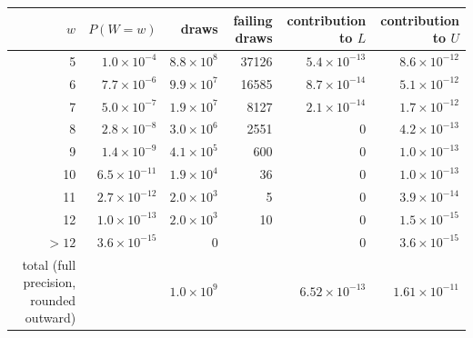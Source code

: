 \begin{tabular}{rrrrrr}\hline\hline
$w$ & $P(W=w)$ & draws & failing draws & contribution to $L$ & contribution to $U$\\\hline
5 & $1.0\times10^{-4}$ & $8.8\times10^{8}$ & 37126 & $5.4\times10^{-13}$ & $8.6\times10^{-12}$\\
6 & $7.7\times10^{-6}$ & $9.9\times10^{7}$ & 16585 & $8.7\times10^{-14}$ & $5.1\times10^{-12}$\\
7 & $5.0\times10^{-7}$ & $1.9\times10^{7}$ & 8127 & $2.1\times10^{-14}$ & $1.7\times10^{-12}$\\
8 & $2.8\times10^{-8}$ & $3.0\times10^{6}$ & 2551 & 0 & $4.2\times10^{-13}$\\
9 & $1.4\times10^{-9}$ & $4.1\times10^{5}$ & 600 & 0 & $1.0\times10^{-13}$\\
10 & $6.5\times10^{-11}$ & $1.9\times10^{4}$ & 36 & 0 & $1.0\times10^{-13}$\\
11 & $2.7\times10^{-12}$ & $2.0\times10^{3}$ & 5 & 0 & $3.9\times10^{-14}$\\
12 & $1.0\times10^{-13}$ & $2.0\times10^{3}$ & 10 & 0 & $1.5\times10^{-15}$\\
$>12$ & $3.6\times10^{-15}$ & 0 & & 0 & $3.6\times10^{-15}$\\\hline
total (full precision, rounded outward) & & $1.0\times10^{9}$ & & $6.52\times10^{-13}$ & $1.61\times10^{-11}$\\
\hline\hline
\end{tabular}
